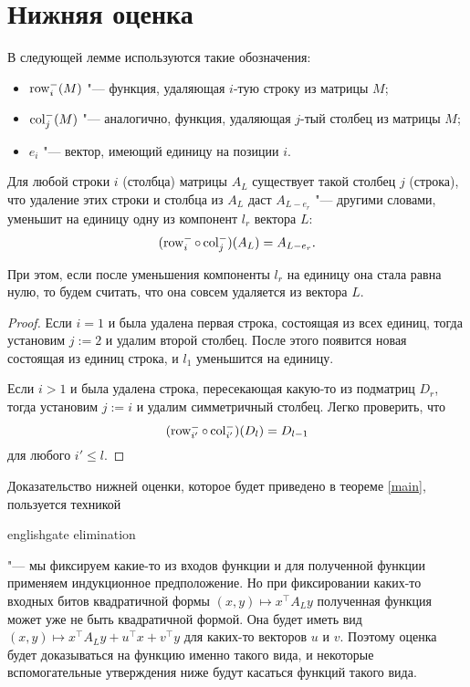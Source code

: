 \documentclass[a4paper, 14pt]{extarticle}
\begin{document}
\section{Нижняя оценка}
\label{sec_bound}

В следующей лемме используются такие обозначения:
\begin{itemize}
\item $\operatorname{row}^-_i(M)$ "--- функция, удаляющая $i$-тую строку из матрицы $M$;
\item $\operatorname{col}^-_j(M)$ "--- аналогично, функция, удаляющая $j$-тый столбец из матрицы $M$;
\item $e_i$ "--- вектор, имеющий единицу на позиции $i$.
\end{itemize}

\begin{lemma} \label{easy}
Для любой строки $i$ (столбца) матрицы $A_L$ существует такой столбец $j$
(строка), что удаление этих строки и столбца из $A_L$ даст $A_{L - e_r}$ "---
другими словами, уменьшит на единицу одну из компонент $l_r$ вектора $L$:
\[
(\operatorname{row}^-_i \circ \operatorname{col}^-_j)(A_L) = A_{L - e_r}.
\]

При этом, если после уменьшения компоненты $l_r$ на единицу она стала равна нулю,
то будем считать, что она совсем удаляется из вектора $L$.
\end{lemma}
\begin{proof}
Если $i = 1$ и была удалена первая строка, состоящая из всех единиц, тогда
установим $j := 2$ и удалим второй столбец. После этого появится новая состоящая
из единиц строка, и $l_1$ уменьшится на единицу.

Если $i > 1$ и была удалена строка, пересекающая какую-то из подматриц $D_r$,
тогда установим $j := i$ и удалим симметричный столбец. Легко проверить, что
\[
(\operatorname{row}^-_{i'} \circ \operatorname{col}^-_{i'})(D_l) = D_{l-1}
\]
для любого $i' \leq l$.
\end{proof}

Доказательство нижней оценки, которое будет приведено в теореме
\ref{main}, пользуется техникой \begin{foreignlanguage}{english}gate
elimination\end{foreignlanguage} "--- мы фиксируем какие-то из входов функции
и для полученной функции применяем индукционное предположение. Но при
фиксировании каких-то входных битов квадратичной формы $(x, y) \mapsto x^\top A_L
y$ полученная функция может уже не быть квадратичной формой. Она будет иметь
вид $(x, y) \mapsto x^\top A_L y + u^\top x + v^\top y$ для каких-то векторов
$u$ и $v$. Поэтому оценка будет доказываться на функцию именно такого вида, и
некоторые вспомогательные утверждения ниже будут касаться функций такого вида.
\end{document}
